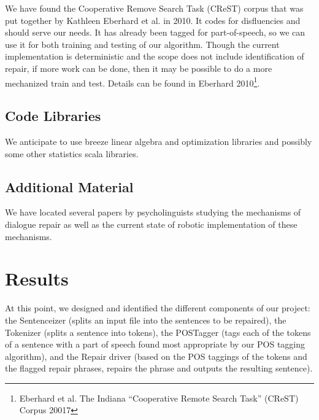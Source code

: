 \documentclass{article}
\begin{document}
\begin{flushleft}

  We have found the Cooperative Remove Search Task (CReST) corpus that was put together by Kathleen Eberhard et al. in 2010. It codes for disfluencies and should serve our needs. It has already been tagged for part-of-speech, so we can use it for both training and testing of our algorithm. Though the current implementation is deterministic and the scope does not include identification of repair, if more work can be done, then it may be possible to do a more mechanized train and test. Details can be found in Eberhard 2010\footnote{Eberhard et al. The Indiana ``Cooperative Remote Search Task'' (CReST) Corpus 20017}. 

\end{flushleft}

\subsection{Code Libraries}

\begin{flushleft}
We anticipate to use breeze linear algebra and optimization libraries and possibly some other statistics scala libraries.
\end{flushleft}

\subsection{Additional Material}

We have located several papers by psycholinguists studying the mechanisms of dialogue repair as well as the current state of robotic implementation of these mechanisms.

\section{Results}

\begin {flushleft}

At this point, we designed and identified the different components of our project: the Sentenceizer (splits an input file into the sentences to be repaired), the Tokenizer (splits a sentence into tokens), the POSTagger (tags each of the tokens of a sentence with a part of speech found most appropriate by our POS tagging algorithm), and the Repair driver (based on the POS taggings of the tokens and the flagged repair phrases, repairs the phrase and outputs the resulting sentence).

\end {flushleft}
\end{document}
